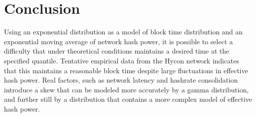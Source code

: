 \documentclass[]{article}
\begin{document}
\section{Conclusion}
Using an exponential distribution as a model of block time distribution and an exponential moving average of network hash power, it is possible to select a difficulty that under theoretical conditions maintains a desired time at the specified quantile.  Tentative empirical data from the Hycon network indicates that this maintains a reasonable block time despite large fluctuations in effective hash power.  Real factors, such as network latency and hashrate consolidation introduce a skew that can be modeled more accurately by a gamma distribution, and further still by a distribution that contains a more complex model of effective hash power. 



\end{document}
